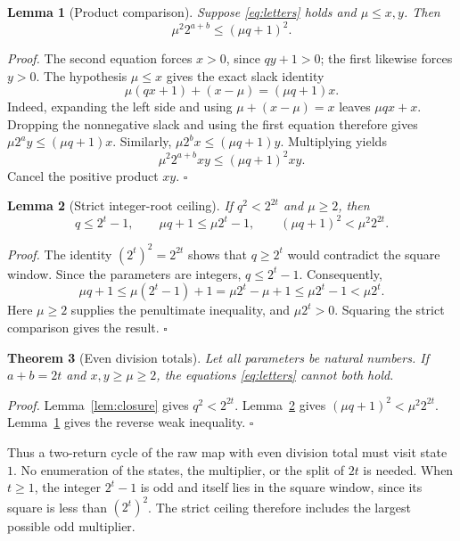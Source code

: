 \documentclass[11pt,letterpaper]{article}
\newtheorem{theorem}{Theorem}
\newtheorem{lemma}[theorem]{Lemma}
\newenvironment{proof}{\noindent\textit{Proof.}}{\hfill\(\square\)}
\begin{document}
\begin{lemma}[Product comparison]
\label{lem:product}
Suppose \eqref{eq:letters} holds and \(\mu\le x,y\). Then
\[
\mu^2 2^{a+b}\le(\mu q+1)^2.
\]
\end{lemma}

\begin{proof}
The second equation forces \(x>0\), since \(qy+1>0\); the first likewise
forces \(y>0\). The hypothesis \(\mu\le x\) gives the exact slack identity
\[
\mu(qx+1)+(x-\mu)=(\mu q+1)x.
\]
Indeed, expanding the left side and using \(\mu+(x-\mu)=x\) leaves
\(\mu qx+x\). Dropping the nonnegative slack and using the first equation
therefore gives \(\mu2^a y\le(\mu q+1)x\). Similarly,
\(\mu2^b x\le(\mu q+1)y\). Multiplying yields
\[
\mu^2 2^{a+b}xy\le(\mu q+1)^2xy.
\]
Cancel the positive product \(xy\).
\end{proof}

\begin{lemma}[Strict integer-root ceiling]
\label{lem:ceiling}
If \(q^2<2^{2t}\) and \(\mu\ge2\), then
\[
q\le2^t-1,
\qquad
\mu q+1\le\mu2^t-1,
\qquad
(\mu q+1)^2<\mu^2 2^{2t}.
\]
\end{lemma}

\begin{proof}
The identity \((2^t)^2=2^{2t}\) shows that \(q\ge2^t\) would contradict
the square window. Since the parameters are integers, \(q\le2^t-1\).
Consequently,
\[
\mu q+1\le\mu(2^t-1)+1
=\mu2^t-\mu+1\le\mu2^t-1<\mu2^t.
\]
Here \(\mu\ge2\) supplies the penultimate inequality, and
\(\mu2^t>0\). Squaring the strict comparison gives the result.
\end{proof}

\begin{theorem}[Even division totals]
\label{thm:even-empty}
Let all parameters be natural numbers. If \(a+b=2t\) and \(x,y\ge\mu\ge2\),
the equations \eqref{eq:letters} cannot both hold.
\end{theorem}

\begin{proof}
Lemma~\ref{lem:closure} gives \(q^2<2^{2t}\).
Lemma~\ref{lem:ceiling} gives \((\mu q+1)^2<\mu^2 2^{2t}\).
Lemma~\ref{lem:product} gives the reverse weak inequality.
\end{proof}

Thus a two-return cycle of the raw map with even division total must visit
state \(1\). No enumeration of the states, the multiplier, or the split of
\(2t\) is needed. When \(t\ge1\), the integer \(2^t-1\) is odd and
itself lies in the square window, since its square is less than \((2^t)^2\).
The strict ceiling therefore includes the largest possible odd multiplier.
\end{document}
